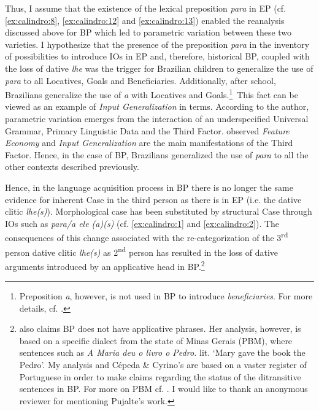 \documentclass[output=paper,colorlinks,citecolor=brown,nonflat]{./langscibook}
\begin{document}
Thus, I assume that the existence of the lexical preposition \textit{para} in EP (cf. \ref{ex:calindro:8}, \ref{ex:calindro:12} and \ref{ex:calindro:13}) enabled the reanalysis discussed above for BP which led to parametric variation between these two varieties. I hypothesize that the presence of the preposition \textit{para} in the inventory of possibilities to introduce IOs in EP and, therefore, historical BP, coupled with the loss of dative \textit{lhe} was the trigger for Brazilian children to generalize the use of \textit{para} to all Locatives, Goals and Beneficiaries. Additionally, after school, Brazilians generalize the use of \textit{a} with Locatives and Goals.\footnote{Preposition \textit{a}, however, is not used in BP to introduce \textit{beneficiaries}. For more details, cf. \citet{Calindro2015}.}~This fact can be viewed as an example of \textit{Input Generalization} in  terms. According to the author, parametric variation emerges from the interaction of an underspecified Universal Grammar, Primary Linguistic Data and the Third Factor. \citet{BiberauerRoberts2015} observed \textit{Feature Economy} and \textit{Input Generalization} are the main manifestations of the Third Factor. Hence, in the case of BP, Brazilians generalized the use of \textit{para} to all the other contexts described previously.

Hence, in the language acquisition process in BP there is no longer the same evidence for inherent Case in the third person as there is in EP (i.e. the dative clitic \textit{lhe(s)}). Morphological case has been substituted by structural Case through IOs such as \textit{para/a ele (a)(s)} (cf. \ref{ex:calindro:1} and \ref{ex:calindro:2}). The consequences of this change associated with the re-categorization of the 3\textsuperscript{rd} person dative clitic \textit{lhe(s)} as 2\textsuperscript{nd} person has resulted in the loss of dative arguments introduced by an applicative head in BP.\footnote{\citet{Pujalte2010} also claims BP does not have applicative phrases. Her analysis, however, is based on a specific dialect from the state of Minas Gerais (PBM), where sentences such as
\textit{A Maria deu o livro o Pedro.}
lit. ‘Mary gave the book the Pedro’. My analysis and Cépeda \& Cyrino’s are based on a vaster register of Portuguese in order to make claims regarding the status of the ditransitive sentences in BP. For more on PBM cf. \citet{Scher1996, TorresMoraisSalles2010}. I would like to thank an anonymous reviewer for mentioning Pujalte’s work.}
\end{document}

